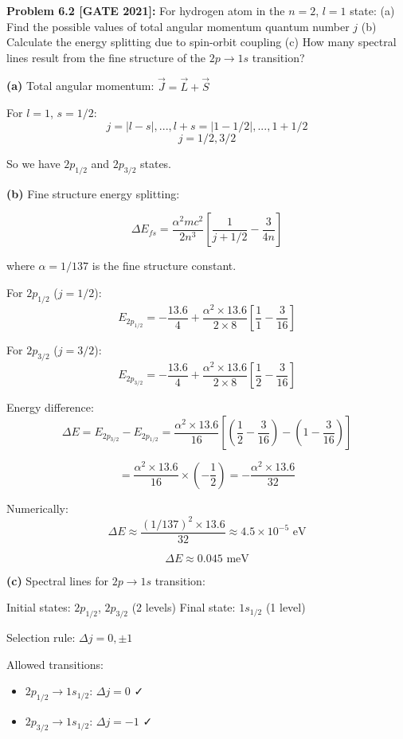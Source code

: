 \documentclass[12pt,a4paper]{article}
\begin{document}
\textbf{Problem 6.2 [GATE 2021]:} For hydrogen atom in the $n=2$, $l=1$ state:
(a) Find the possible values of total angular momentum quantum number $j$
(b) Calculate the energy splitting due to spin-orbit coupling
(c) How many spectral lines result from the fine structure of the $2p \to 1s$ transition?

\begin{solution}
\textbf{(a)} Total angular momentum: $\vec{J} = \vec{L} + \vec{S}$

For $l = 1$, $s = 1/2$:
$$j = |l - s|, ..., l + s = |1 - 1/2|, ..., 1 + 1/2$$
$$j = 1/2, 3/2$$

So we have $2p_{1/2}$ and $2p_{3/2}$ states.

\textbf{(b)} Fine structure energy splitting:

$$\Delta E_{fs} = \frac{\alpha^2 mc^2}{2n^3}\left[\frac{1}{j+1/2} - \frac{3}{4n}\right]$$

where $\alpha = 1/137$ is the fine structure constant.

For $2p_{1/2}$ ($j = 1/2$):
$$E_{2p_{1/2}} = -\frac{13.6}{4} + \frac{\alpha^2 \times 13.6}{2 \times 8}\left[\frac{1}{1} - \frac{3}{16}\right]$$

For $2p_{3/2}$ ($j = 3/2$):
$$E_{2p_{3/2}} = -\frac{13.6}{4} + \frac{\alpha^2 \times 13.6}{2 \times 8}\left[\frac{1}{2} - \frac{3}{16}\right]$$

Energy difference:
$$\Delta E = E_{2p_{3/2}} - E_{2p_{1/2}} = \frac{\alpha^2 \times 13.6}{16}\left[\left(\frac{1}{2} - \frac{3}{16}\right) - \left(1 - \frac{3}{16}\right)\right]$$

$$= \frac{\alpha^2 \times 13.6}{16} \times \left(-\frac{1}{2}\right) = -\frac{\alpha^2 \times 13.6}{32}$$

Numerically:
$$\Delta E \approx \frac{(1/137)^2 \times 13.6}{32} \approx 4.5 \times 10^{-5}\text{ eV}$$

$$\Delta E \approx 0.045\text{ meV}$$

\textbf{(c)} Spectral lines for $2p \to 1s$ transition:

Initial states: $2p_{1/2}$, $2p_{3/2}$ (2 levels)
Final state: $1s_{1/2}$ (1 level)

Selection rule: $\Delta j = 0, \pm 1$

Allowed transitions:
\begin{itemize}
    \item $2p_{1/2} \to 1s_{1/2}$: $\Delta j = 0$ ✓
    \item $2p_{3/2} \to 1s_{1/2}$: $\Delta j = -1$ ✓
\end{itemize}


\end{solution}
\end{document}
